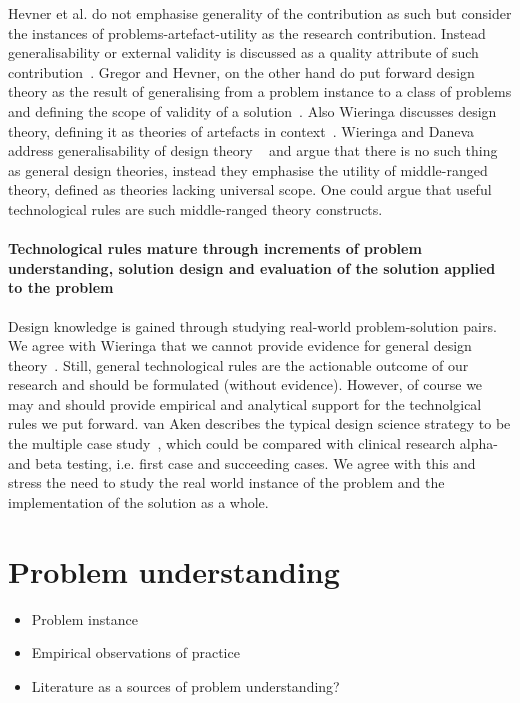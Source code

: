 \documentclass[graybox]{svmult}
\begin{document}
Hevner et al. do not emphasise generality of the contribution as such but consider the instances of problems-artefact-utility as the research contribution. Instead generalisability or external validity is discussed as a quality attribute of such contribution~\cite{hevner_design_2004}. Gregor and Hevner, on the other hand do put forward design theory as the result of generalising from a problem instance to a class of problems and defining the scope of validity of a solution~\cite{gregor_positioning_2013}. Also Wieringa discusses design theory, defining it as theories of artefacts in context~\cite{wieringa_design_2009}. Wieringa and Daneva address generalisability of design theory ~\cite{wieringa_six_2015} and argue that there is no such thing as general design theories, instead they emphasise the utility of middle-ranged theory, defined as theories lacking universal scope. One could argue that useful technological rules are such middle-ranged theory constructs.

\paragraph{Technological rules mature through increments of problem understanding, solution design and evaluation of the solution applied to the problem} 

Design knowledge is gained through studying real-world problem-solution pairs. We agree with Wieringa that we cannot provide evidence for general design theory~\cite{wieringa_six_2015}. Still, general technological rules are the actionable outcome of our research and should be formulated (without evidence). However, of course we may and should provide empirical and analytical support for the technolgical rules we put forward. van Aken describes the typical design science strategy to be the multiple case study~\cite{van_aken_management_2004}, which could be compared with clinical research alpha- and beta testing, i.e. first case and succeeding cases. We agree with this and stress the need to study the real world instance of the problem and the implementation of the solution as a whole.

\section{Problem understanding}
\begin{itemize}
\item Problem instance
\item Empirical observations of practice
\item Literature as a sources of problem understanding?
\end{itemize}
\end{document}

